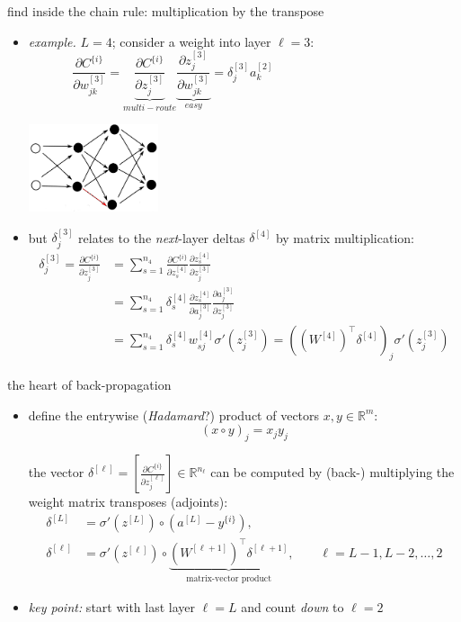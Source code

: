 \documentclass[xcolor={svgnames},
               hyperref={colorlinks,citecolor=DeepPink4,linkcolor=FireBrick,urlcolor=Maroon}]
               {beamer}
\newcommand{\RR}{\mathbb{R}}
\begin{document}
\begin{frame}{find inside the chain rule: multiplication by the transpose}

\begin{itemize}
\item \emph{example.} $L=4$; consider a weight into layer $\ell=3$:
   $$\frac{\partial C^{\{i\}}}{\partial w_{jk}^{[3]}} = \underbrace{\frac{\partial C^{\{i\}}}{\partial z_{j}^{[3]}}}_{multi-route} \underbrace{\frac{\partial z_{j}^{[3]}}{\partial w_{jk}^{[3]}}}_{easy} = \delta_j^{[3]} a_{k}^{[2]} \phantom{sdlkjaf ajdsf lkadfj sdafkj}$$

\vspace{-25mm}
\hfill \includegraphics[width=0.3\textwidth]{figs/redcleannet}
\item but $\delta_j^{[3]}$ relates to the \emph{next}-layer deltas $\delta^{[4]}$ by matrix multiplication:
\begin{align*}
\delta_j^{[3]} = \frac{\partial C^{\{i\}}}{\partial z_{j}^{[3]}} &= \sum_{s=1}^{n_4} \frac{\partial C^{\{i\}}}{\partial z_{s}^{[4]}} \frac{\partial z_{s}^{[4]}}{\partial z_{j}^{[3]}} \\
  &= \sum_{s=1}^{n_4} \delta_s^{[4]} \frac{\partial z_{s}^{[4]}}{\partial a_{j}^{[3]}} \frac{\partial a_{j}^{[3]}}{\partial z_{j}^{[3]}} \\
  &= \sum_{s=1}^{n_4} \delta_s^{[4]} w_{sj}^{[4]} \sigma'(z_{j}^{[3]}) = \left((W^{[4]})^\top \delta^{[4]}\right)_j \sigma'(z_{j}^{[3]})
\end{align*}
\end{itemize}
\end{frame}


\begin{frame}{the heart of back-propagation}

\begin{itemize}
\item define the entrywise (\emph{Hadamard}?) product of vectors $x,y\in\RR^m$:
    $$(x\circ y)_j = x_j y_j$$

\begin{lemma}
the vector $\displaystyle \delta^{[\ell]} = \left[\frac{\partial C^{\{i\}}}{\partial z_j^{[\ell]}}\right]  \in \RR^{n_{\ell}}$ can be computed by (back-) multiplying the weight matrix transposes (adjoints):
\begin{align*}
\delta^{[L]} &= \sigma'(z^{[L]}) \circ (a^{[L]} - y^{\{i\}}), \\
\delta^{[\ell]} &= \sigma'(z^{[\ell]}) \circ \underbrace{(W^{[\ell+1]})^\top \delta^{[\ell+1]}}_{\text{matrix-vector product}}, \qquad \ell = L-1,L-2,\dots,2
\end{align*}
\end{lemma}

\bigskip
\item \emph{key point:} start with last layer $\ell=L$ and count \emph{down} to $\ell=2$
\end{itemize}
\end{frame}
\end{document}
